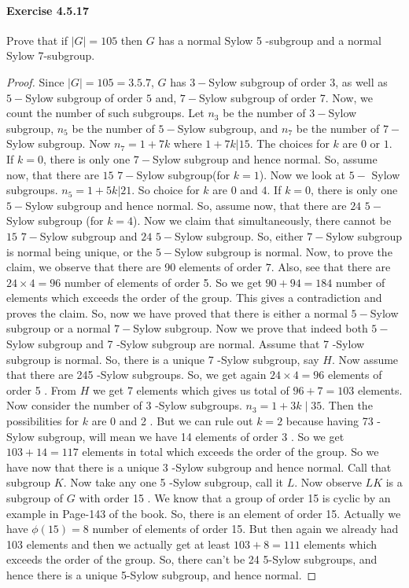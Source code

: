 \documentclass{article}
\theoremstyle{definition}
\begin{document}
\paragraph{Exercise 4.5.17} Prove that if $|G|=105$ then $G$ has a normal Sylow 5 -subgroup and a normal Sylow 7-subgroup.
\begin{proof}    
Since $|G|=105=3.5.7$, $G$ has $3-$Sylow subgroup of order $3$, as well as $5-$Sylow subgroup of order $5$ and, $7-$Sylow subgroup of order 7. Now, we count the number of such subgroups. Let $n_{3}$ be the number of $3-$Sylow subgroup, $n_{5}$ be the number of  $5-$Sylow subgroup, and $n_{7}$ be the number of $7-$Sylow subgroup. Now $n_{7}=1+7k$ where $1+7k|15$. The choices for $k$ are $0$ or $1$. If $k=0$, there is only one $7-$Sylow subgroup and hence normal. So, assume now, that there are $15$ $7-$Sylow subgroup(for $k=1$). Now we look at $5-$ Sylow subgroups. $n_{5}=1+5k| 21$. So choice for $k$ are $0$ and $4$. If $k=0$, there is only one $5-$Sylow subgroup and hence normal. So, assume now, that there are $24$ $5-$Sylow subgroup (for $k=4$). Now we claim that simultaneously, there cannot be $15$ $7-$Sylow subgroup and $24$ $5-$Sylow subgroup. So, either $7-$Sylow subgroup is normal being unique, or  the $5-$Sylow subgroup is normal. Now, to prove the claim, we observe that there are 90 elements of order $7$. Also, see that there are $24\times 4=96$ number of elements of order 5. So we get $90+94=184$ number of elements which exceeds the order of the group. This gives a contradiction and proves the claim. So, now we have proved that there is either a normal $5-$Sylow subgroup or a normal $7-$Sylow subgroup.
    Now we prove that indeed both $5-$ Sylow subgroup and 7 -Sylow subgroup are normal. Assume that 7 -Sylow subgroup is normal. So, there is a unique 7 -Sylow subgroup, say $H$. Now assume that there are 245 -Sylow subgroups. So, we get again $24 \times 4=96$ elements of order 5 . From $H$ we get 7 elements which gives us total of $96+7=103$ elements. Now consider the number of 3 -Sylow subgroups. $n_3=1+3 k \mid 35$. Then the possibilities for $k$ are 0 and 2 . But we can rule out $k=2$ because having 73 -Sylow subgroup, will mean we have 14 elements of order 3 . So we get $103+14=117$ elements in total which exceeds the order of the group. So we have now that there is a unique 3 -Sylow subgroup and hence normal. Call that subgroup $K$. Now take any one 5 -Sylow subgroup, call it $L$. Now observe $L K$ is a subgroup of $G$ with order 15 . We know that a group of order 15 is cyclic by an example in Page-143 of the book. So, there is an element of order 15. Actually we have $\phi(15)=8$ number of elements of order 15. But then again we already had 103 elements and then we actually get at least $103+8=111$ elements which exceeds the order of the group. So, there can't be 24 5-Sylow subgroups, and hence there is a unique 5-Sylow subgroup, and hence normal.
\end{proof}
\end{document}
